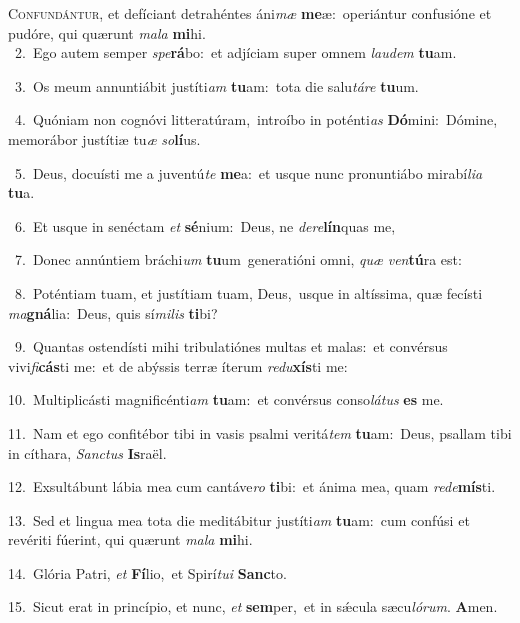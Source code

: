 \lettrine{\initial\textcolor{\initialcolor}{C}}{onfundántur,} et defíciant detrahéntes áni\textit{mæ} \textbf{me}\-æ:~\star operiántur confusióne et pudóre, qui quærunt \textit{ma}\-\textit{la} \textbf{mi}\-hi.\\
{\numbfont\textcolor{\numbcolor}{~2.}}~Ego autem semper \textit{spe}\-\textbf{rá}bo:~\star et adjíciam super omnem \textit{lau}\-\textit{dem} \textbf{tu}\-am.\par
{\numbfont\textcolor{\numbcolor}{~3.}}~Os meum annuntiábit justíti\textit{am} \textbf{tu}\-am:~\star tota die salu\-\textit{tá}\-\textit{re} \textbf{tu}\-um.\par
{\numbfont\textcolor{\numbcolor}{~4.}}~Quóniam non cognóvi litteratúram,~\dagger introíbo in poténti\textit{as} \textbf{Dó}\-mini:~\star Dómine, memorábor justítiæ tu\textit{æ} \textit{so}\-\textbf{lí}us.\par
{\numbfont\textcolor{\numbcolor}{~5.}}~Deus, docuísti me a juventú\textit{te} \textbf{me}\-a:~\star et usque nunc pronuntiábo mirabí\-\textit{li}\-\textit{a} \textbf{tu}\-a.\par
{\numbfont\textcolor{\numbcolor}{~6.}}~Et usque in senéctam \textit{et} \textbf{sé}\-nium:~\star Deus, ne \textit{de}\-\textit{re}\textbf{lín}quas me,\par
{\numbfont\textcolor{\numbcolor}{~7.}}~Donec annúntiem bráchi\textit{um} \textbf{tu}\-um~\star generatióni omni, \textit{quæ} \textit{ven}\-\textbf{tú}ra est:\par
{\numbfont\textcolor{\numbcolor}{~8.}}~Poténtiam tuam, et justítiam tuam, Deus,~\dagger usque in altíssima, quæ fecísti \textit{ma}\-\textbf{gná}lia:~\star Deus, quis sí\-\textit{mi}\-\textit{lis} \textbf{ti}\-bi?\par
{\numbfont\textcolor{\numbcolor}{~9.}}~Quantas ostendísti mihi tribulatiónes multas et malas:~\dagger et convérsus vivi\-\textit{fi}\-\textbf{cás}ti me:~\star et de abýssis terræ íterum \textit{re}\-\textit{du}\textbf{xís}ti me:\par
{\numbfont\textcolor{\numbcolor}{10.}}~Multiplicásti magnificénti\textit{am} \textbf{tu}\-am:~\star et convérsus conso\-\textit{lá}\-\textit{tus} \textbf{es} me.\par
{\numbfont\textcolor{\numbcolor}{11.}}~Nam et ego confitébor tibi in vasis psalmi veritá\textit{tem} \textbf{tu}\-am:~\star Deus, psallam tibi in cíthara, \textit{Sanc}\-\textit{tus} \textbf{Is}\-raël.\par
{\numbfont\textcolor{\numbcolor}{12.}}~Exsultábunt lábia mea cum cantáve\textit{ro} \textbf{ti}\-bi:~\star et ánima mea, quam \textit{red}\-\textit{e}\textbf{mís}ti.\par
{\numbfont\textcolor{\numbcolor}{13.}}~Sed et lingua mea tota die meditábitur justíti\textit{am} \textbf{tu}\-am:~\star cum confúsi et revériti fúerint, qui quærunt \textit{ma}\-\textit{la} \textbf{mi}\-hi.\par
{\numbfont\textcolor{\numbcolor}{14.}}~Glória Patri, \textit{et} \textbf{Fí}\-lio,~\star et Spirí\-\textit{tu}\-\textit{i} \textbf{Sanc}\-to.\par
{\numbfont\textcolor{\numbcolor}{15.}}~Sicut erat in princípio, et nunc, \textit{et} \textbf{sem}\-per,~\star et in sǽcula sæcu\-\textit{ló}\-\textit{rum}. \textbf{A}\-men.\par
